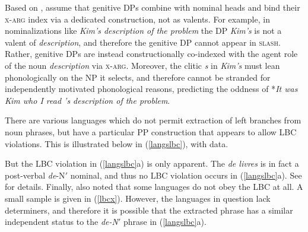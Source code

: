 \documentclass[output=paper
 	        ,biblatex
                ,babelshorthands
                ,newtxmath
                ,draftmode
                ,colorlinks, citecolor=brown
]{langscibook}
\begin{document}
\noindent
Based on \citet[133]{cxsag07}, \citet[197, 198]{CP2020a-u} assume that genitive DPs combine
with nominal heads and bind their \textsc{x-arg} index via a dedicated construction, not as valents.
For example, in nominalizations like \emph{Kim's description of the problem} the DP \emph{Kim's} is
not a valent of \emph{description}, and therefore the genitive DP cannot appear in \textsc{slash}.
Rather, genitive DPs are instead constructionally co-indexed with the agent role of the noun
\emph{description} via \textsc{x-arg}.  Moreover, the clitic \emph{s} in \emph{Kim's} must lean
phonologically on the NP it selects, and therefore cannot be stranded for independently motivated
phonological reasons, predicting the oddness of *\emph{It was Kim who I read 's description of the
  problem}.

There are various languages which do not permit extraction of left branches from noun phrases, but
have a particular PP construction that appears to allow LBC violations.  This is illustrated below
in (\ref{langslbc}), with  data.

\eal \label{langslbc}

 \zl 


\noindent
But the LBC violation in (\ref{langslbc}a) is only apparent. The {\it de livres} is in fact a
post-verbal {\it de}-N$'$ nominal, and thus no LBC violation occurs in (\ref{langslbc}a). See
\citet{Abeille:Bonami:ea:04} for details.  Finally, \citet[236--237]{Ross67} also noted that some languages do
not obey the LBC at all. A small sample is given in (\ref{lbcx}). However, the languages in question
lack determiners, and therefore it is possible that the extracted phrase has a similar
independent status to the  {\it de-N}$'$ phrase in (\ref{langslbc}a).
 
\end{document}
